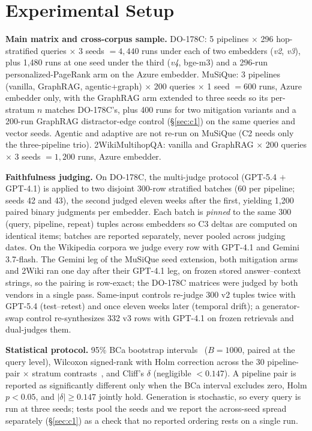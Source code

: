 \section{Experimental Setup}
\label{sec:experiments}

\textbf{Main matrix and cross-corpus sample.} DO-178C: 5 pipelines $\times$
296 hop-stratified queries $\times$ 3 seeds $= 4{,}440$ runs under each
of two embedders (\emph{v2}, \emph{v3}), plus 1{,}480 runs at one seed
under the third (\emph{v4}, bge-m3) and a 296-run personalized-PageRank
arm on the Azure embedder. MuSiQue: 3 pipelines (vanilla,
GraphRAG, agentic+graph) $\times$ 200 queries $\times$ 1 seed $= 600$ runs,
Azure embedder only, with the GraphRAG arm extended to three seeds so
its per-stratum $n$ matches DO-178C's, plus 400 runs for two mitigation
variants and a 200-run GraphRAG distractor-edge control
(\S\ref{sec:c1}) on the same queries and vector seeds. Agentic and
adaptive are not re-run on MuSiQue (C2 needs only the three-pipeline
trio). 2WikiMultihopQA: vanilla and GraphRAG $\times$ 200 queries
$\times$ 3 seeds $= 1{,}200$ runs, Azure embedder.

\textbf{Faithfulness judging.} On DO-178C, the multi-judge protocol
(GPT-5.4 $+$ GPT-4.1) is applied to two disjoint 300-row stratified
batches (60 per pipeline; seeds 42 and 43), the second judged eleven
weeks after the first, yielding 1{,}200 paired binary judgments per
embedder. Each batch is \emph{pinned} to the same 300 (query,
pipeline, repeat) tuples across embedders so C3 deltas are computed
on identical items; batches are reported separately, never pooled
across judging dates. On the Wikipedia corpora we judge every row with
GPT-4.1 and Gemini 3.7-flash. The Gemini leg of the MuSiQue seed
extension, both mitigation arms and 2Wiki ran one day after their
GPT-4.1 leg, on frozen stored answer--context strings, so the pairing is
row-exact; the DO-178C matrices were judged by both vendors in a single
pass.
Same-input controls re-judge 300 v2 tuples twice with GPT-5.4
(test--retest) and once eleven weeks later (temporal drift); a
generator-swap control re-synthesizes 332 v3 rows with GPT-4.1 on
frozen retrievals and dual-judges them.

\textbf{Statistical protocol.} 95\% BCa bootstrap
intervals~\cite{du2025bootstrap} ($B{=}1000$, paired at the query
level), Wilcoxon signed-rank with Holm correction across the 30
pipeline-pair $\times$ stratum
contrasts~\cite{bergkirkpatrick2012,koehn2004}, and Cliff's $\delta$
(negligible ${<}0.147$). A pipeline pair
is reported as significantly different only when the BCa interval excludes
zero, Holm $p{<}0.05$, and $|\delta|\!\geq\!0.147$ jointly hold.
Generation is stochastic, so every query is run at three seeds; tests
pool the seeds and we report the across-seed spread separately
(\S\ref{sec:c1}) as a check that no reported ordering rests on a
single run.

